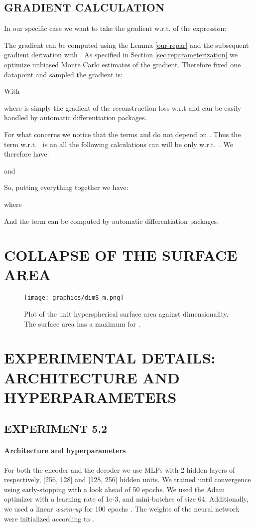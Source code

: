 \documentclass[letterpaper]{article}
\begin{document}
\subsection{GRADIENT CALCULATION}
In our specific case we want to take the gradient w.r.t.  of the expression:

The gradient can be computed using the Lemma \ref{our-repar} and the subsequent gradient derivation with . 
As specified in Section \ref{sec:reparameterization} we optimize unbiased Monte Carlo estimates of the gradient. Therefore fixed one datapoint  and sampled  the gradient is:


With




where  is simply the gradient of the reconstruction loss w.r.t  and can be easily handled by automatic differentiation packages. 

For what concerns  we notice that the terms  and  do not depend on . Thus the  term w.r.t.~ is  an all the following calculations can will be only w.r.t.~. We therefore have:


and

So, putting everything together we have:

where

And the term  can be computed by automatic differentiation packages. 

\section{COLLAPSE OF THE SURFACE AREA}\label{app:surface}

\begin{figure}[H]
  \centering
  \texttt{[image: graphics/dimS\_m.png]}
  \caption{Plot of the unit hyperspherical surface area against dimensionality. The surface area has a maximum for .}
  \label{fig:sphere-area}
\end{figure}

\section{EXPERIMENTAL DETAILS: ARCHITECTURE AND HYPERPARAMETERS}
\label{sect:appDetails}

\subsection{EXPERIMENT 5.2}
\paragraph{Architecture and hyperparameters} For both the encoder and the decoder we use MLPs with 2 hidden layers of respectively, [256, 128] and [128, 256] hidden units. We trained until convergence using early-stopping with a look ahead of 50 epochs. We used the Adam optimizer \citep{kingma2014adam} with a learning rate of 1e-3, and mini-batches of size 64. Additionally, we used a linear \textit{warm-up} for 100 epochs \citep{bowman2015generating}. The weights of the neural network were initialized according to \citep{glorot2010understanding}.
\end{document}
